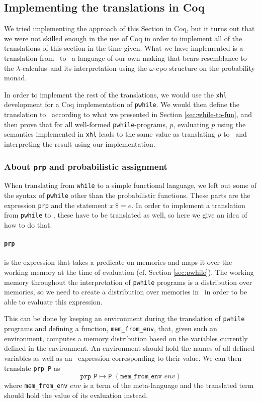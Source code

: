 \documentclass[11pt, leqno, titlepage]{article}
\theoremstyle{definition}
\begin{document}
\subsection{Implementing the translations in Coq}
\label{sec:howto-coq}
We tried implementing the approach of this Section in Coq, but it turns out that we
were not skilled enough in the use of Coq in order to implement all of the
translations of this section in the time given. What we have implemented is a
translation from \rml\ to \srml --a language of our own making that bears resemblance
to the $\lambda$-calculus--and its interpretation using the $\omega$-cpo structure on
the probability monad. 

In order to implement the rest of the translations, we would use the \texttt{xhl}
development for a Coq implementation of \texttt{pwhile}. We would then define the
translation to \rml\ according to what we presented in Section
\ref{sec:while-to-fun}, and then prove that for all well-formed
\texttt{pwhile}-programs, $p$, evaluating $p$ using the semantics implemented in
\texttt{xhl} leads to the same value as translating $p$ to \rml\ and interpreting the
result using our implementation. 

\subsubsection{About \texttt{prp} and probabilistic assignment}
When translating from \texttt{while} to a simple functional language, we left out
some of the syntax of \texttt{pwhile} other than the probabilistic functions. These
parts are the expression \texttt{prp} and the statement $x~\$= e$. In order to
implement a translation from \texttt{pwhile} to \rml, these have to be translated as
well, so here we give an idea of how to do that.

\paragraph{\texttt{prp}} is the expression that takes a predicate on memories and
maps it over the working memory at the time of evaluation (cf. Section
\ref{sec:pwhile}). The working memory throughout the interpretation of
\texttt{pwhile} programs is a distribution over memories, so we need to create a
distribution over memories in \rml\ in order to be able to evaluate this expression.

This can be done by keeping an environment during the translation of \texttt{pwhile}
programs and defining a function, \texttt{mem\_from\_env}, that, given such an
environment, computes a memory distribution based on the variables currently defined
in the environment. An environment should hold the names of all defined variables as
well as an \rml\ expression corresponding to their value. We can then translate
\texttt{prp P} as
$$\texttt{prp P} \mapsto \texttt{P } (\texttt{mem\_from\_env } env)$$
where \texttt{mem\_from\_env} $env$ is a term of the meta-language and the translated
term should hold the value of its evaluation instead. 
\end{document}

